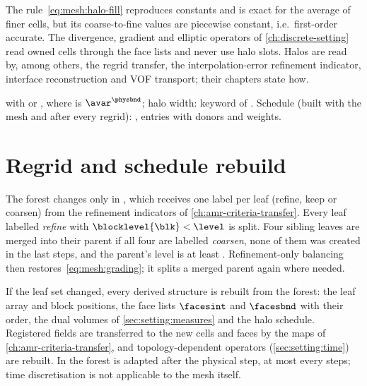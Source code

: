 The rule~\cref{eq:mesh:halo-fill} reproduces constants and is exact for the
average of finer cells, but its coarse-to-fine values are piecewise constant,
i.e.\ first-order accurate. The divergence, gradient and elliptic operators of
\cref{ch:discrete-setting} read owned cells through the face lists and never
use halo slots. Halos are read by, among others, the regrid transfer, the
interpolation-error refinement indicator, interface reconstruction and VOF
transport; their chapters state how.



\begin{implnote}
 with
 or , where
 is $\avar^{\physbnd}$; halo width: keyword 
of . Schedule (built with the mesh and after every
regrid): , entries
 with donors and weights.
\end{implnote}

\section{Regrid and schedule rebuild}\label{sec:mesh:regrid}
The forest changes only in , which receives one label per leaf
(refine, keep or coarsen) from the refinement indicators of
\cref{ch:amr-criteria-transfer}. Every leaf labelled \emph{refine} with
$\blocklevel{\blk}<\level$ is split. Four sibling leaves are merged into their
parent if all four are labelled \emph{coarsen}, none of them was created in
the last  steps, and the parent's level is at least
. Refinement-only balancing then
restores~\cref{eq:mesh:grading}; it splits a merged parent again where needed.

If the leaf set changed, every derived structure is rebuilt from the forest:
the leaf array and block positions, the face lists $\facesint$ and $\facesbnd$
with their order, the dual volumes of \cref{sec:setting:measures} and the halo
schedule. Registered fields are transferred to the new cells and faces by the
maps of \cref{ch:amr-criteria-transfer}, and topology-dependent operators
(\cref{sec:setting:time}) are rebuilt. In 
the forest is adapted after the physical step, at most every
 steps; time discretisation is not applicable to the
mesh itself.

